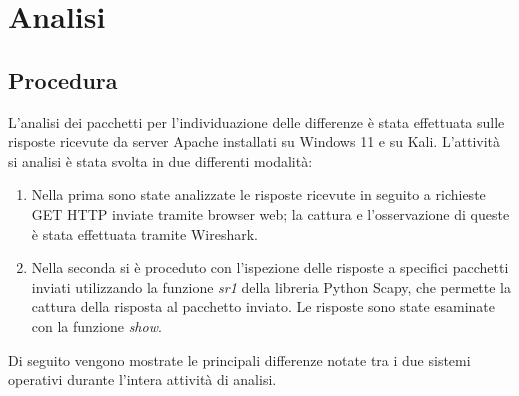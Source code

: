 \chapter{Analisi}

\section{Procedura}
L'analisi dei pacchetti per l'individuazione delle differenze è stata effettuata sulle risposte ricevute da server Apache installati su Windows 11 e su Kali.
L'attività si analisi è stata svolta in due differenti modalità:
\begin{enumerate}
	\item Nella prima sono state analizzate le risposte ricevute in seguito a richieste GET HTTP inviate tramite browser web; la cattura e l'osservazione di queste è stata effettuata tramite Wireshark.
	\item Nella seconda si è proceduto con l'ispezione delle risposte a specifici pacchetti inviati utilizzando la funzione \textit{sr1} della libreria Python Scapy, che permette la cattura della risposta al pacchetto inviato. Le risposte sono state esaminate con la funzione \textit{show}.
\end{enumerate}
Di seguito vengono mostrate le principali differenze notate tra i due sistemi operativi durante l'intera attività di analisi.

